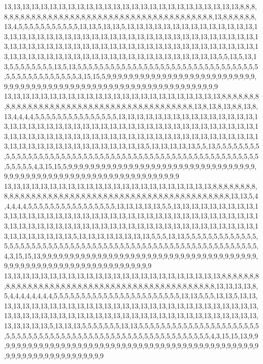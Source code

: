13,13,13,13,13,13,13,13,13,13,13,13,13,13,13,13,13,13,13,13,13,13,13,13,13,13,8,8,8,8,8,8,8,8,8,8,8,8,8,8,8,8,8,8,8,8,8,8,8,8,8,8,8,8,8,8,8,8,8,8,8,8,8,8,8,8,8,13,8,8,8,8,8,8,13,4,5,5,5,5,5,5,5,5,5,5,5,13,13,5,13,13,5,13,13,13,13,13,13,13,13,13,13,13,13,13,13,13,13,13,13,13,13,13,13,13,13,13,13,13,13,13,13,13,13,13,13,13,13,13,13,13,13,13,13,13,13,13,13,13,13,13,13,13,13,13,13,13,13,13,13,13,13,13,13,13,13,13,13,13,13,13,13,13,13,13,13,13,13,13,13,13,13,13,13,13,13,13,13,13,13,13,13,13,13,13,13,5,5,13,5,13,13,5,5,5,5,5,5,5,5,13,5,13,5,5,5,5,5,5,5,5,5,5,5,5,5,5,5,5,5,5,5,5,5,5,5,5,5,5,5,5,5,5,5,5,5,5,5,5,5,5,5,5,5,5,5,5,5,5,3,15,15,5,9,9,9,9,9,9,9,9,9,9,9,9,9,9,9,9,9,9,9,9,9,9,9,9,9,9,9,9,9,9,9,9,9,9,9,9,9,9,9,9,9,9,9,9,9,9,9,9,9,9,9,9,9,9,9,9,9,9,9,9,9,9,9,9,9,9
13,13,13,13,13,13,13,13,13,13,13,13,13,13,13,13,13,13,13,13,13,13,13,13,8,8,8,8,8,8,8,8,8,8,8,8,8,8,8,8,8,8,8,8,8,8,8,8,8,8,8,8,8,8,8,8,8,8,8,8,8,8,8,8,8,13,8,13,8,13,8,8,13,8,13,4,4,4,4,5,5,5,5,5,5,5,5,5,5,5,5,5,5,5,13,13,13,13,13,13,13,13,13,13,13,13,13,13,13,13,13,13,13,13,13,13,13,13,13,13,13,13,13,13,13,13,13,13,13,13,13,13,13,13,13,13,13,13,13,13,13,13,13,13,13,13,13,13,13,13,13,13,13,13,13,13,13,13,13,13,13,13,13,13,13,13,13,13,13,13,13,13,13,13,13,13,13,13,13,13,13,5,13,13,13,13,13,5,5,13,5,5,5,5,5,5,5,5,5,5,5,5,5,5,5,5,5,5,5,5,5,5,5,5,5,5,5,5,5,5,5,5,5,5,5,5,5,5,5,5,5,5,5,5,5,5,5,5,5,5,5,5,5,5,5,5,5,5,5,4,3,15,15,5,9,9,9,9,9,9,9,9,9,9,9,9,9,9,9,9,9,9,9,9,9,9,9,9,9,9,9,9,9,9,9,9,9,9,9,9,9,9,9,9,9,9,9,9,9,9,9,9,9,9,9,9,9,9,9,9,9,9,9,9,9,9,9,9,9,9
13,13,13,13,13,13,13,13,13,13,13,13,13,13,13,13,13,13,13,13,13,13,13,8,8,8,8,8,8,8,8,8,8,8,8,8,8,8,8,8,8,8,8,8,8,8,8,8,8,8,8,8,8,8,8,8,8,8,8,8,8,8,8,8,8,8,8,8,8,8,8,8,13,13,5,4,4,4,4,4,5,5,5,5,5,5,5,5,5,5,5,5,5,5,5,5,13,13,13,13,13,5,5,13,13,13,13,13,13,13,13,13,13,13,13,13,13,13,13,13,13,13,13,13,13,13,13,13,13,13,13,13,13,13,13,13,13,13,13,13,13,13,13,13,13,13,13,13,13,13,13,13,13,13,13,13,13,13,13,13,13,13,13,13,13,13,13,13,13,13,13,13,13,13,13,13,5,13,13,13,13,13,13,13,13,5,5,5,13,13,5,5,5,5,5,5,5,5,5,5,5,5,5,5,5,5,5,5,5,5,5,5,5,5,5,5,5,5,5,5,5,5,5,5,5,5,5,5,5,5,5,5,5,5,5,5,5,5,5,5,5,5,5,5,5,5,5,5,5,4,3,15,15,13,9,9,9,9,9,9,9,9,9,9,9,9,9,9,9,9,9,9,9,9,9,9,9,9,9,9,9,9,9,9,9,9,9,9,9,9,9,9,9,9,9,9,9,9,9,9,9,9,9,9,9,9,9,9,9,9,9,9,9,9,9,9,9,9,9,9
13,13,13,13,13,13,13,13,13,13,13,13,13,13,13,13,13,13,13,13,13,13,13,13,8,8,8,8,8,8,8,8,8,8,8,8,8,8,8,8,8,8,8,8,8,8,8,8,8,8,8,8,8,8,8,8,8,8,8,8,8,8,8,8,8,8,8,8,8,13,13,13,13,8,5,4,4,4,4,4,4,4,4,5,5,5,5,5,5,5,5,5,5,5,5,5,5,5,5,5,5,5,5,5,5,5,13,13,5,5,5,13,13,5,13,13,13,13,13,13,13,13,13,13,13,13,13,13,13,13,13,13,13,13,13,13,13,13,13,13,13,13,13,13,13,13,13,13,13,13,13,13,13,13,13,13,13,13,13,13,13,13,13,13,13,13,13,13,13,13,13,13,13,13,13,13,13,5,13,13,13,5,5,5,5,5,5,5,13,13,5,5,5,5,5,5,5,5,5,5,5,5,5,5,5,5,5,5,5,5,5,5,5,5,5,5,5,5,5,5,5,5,5,5,5,5,5,5,5,5,5,5,5,5,5,5,5,5,5,5,5,5,5,5,5,5,5,5,5,4,3,15,15,13,9,9,9,9,9,9,9,9,9,9,9,9,9,9,9,9,9,9,9,9,9,9,9,9,9,9,9,9,9,9,9,9,9,9,9,9,9,9,9,9,9,9,9,9,9,9,9,9,9,9,9,9,9,9,9,9,9,9,9,9,9,9,9,9,9,9
